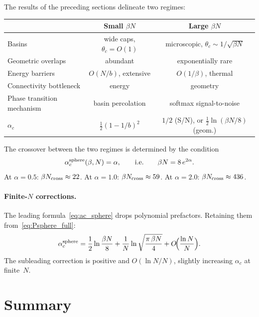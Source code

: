 \documentclass[11pt]{article}
\begin{document}
The results of the preceding sections delineate two regimes:

\begin{center}
\begin{tabular}{lcc}
\toprule
  & Small $\beta N$ & Large $\beta N$ \\
\midrule
Basins & wide caps, $\theta_c = O(1)$
       & microscopic, $\theta_c \sim 1/\sqrt{\beta N}$ \\
Geometric overlaps & abundant
                   & exponentially rare \\
Energy barriers & $O(N/b)$, extensive
               & $O(1/\beta)$, thermal \\
Connectivity bottleneck & energy
                        & geometry \\
Phase transition mechanism & basin percolation
                          & softmax signal-to-noise \\
$\alpha_c$ & $\frac{1}{2}(1-1/b)^2$
           & $1/2$ (S/N), or $\frac{1}{2}\ln(\beta N/8)$ (geom.) \\
\bottomrule
\end{tabular}
\end{center}

The crossover between the two regimes is determined by
the condition
\begin{equation}
  \alpha_c^{\rm sphere}(\beta, N) = \alpha,
  \qquad\text{i.e.}\qquad
  \beta N = 8\,e^{2\alpha}.
\end{equation}
At $\alpha = 0.5$: $\beta N_{\rm cross} \approx 22$.
At $\alpha = 1.0$: $\beta N_{\rm cross} \approx 59$.
At $\alpha = 2.0$: $\beta N_{\rm cross} \approx 436$.

\paragraph{Finite-$N$ corrections.}
The leading formula~\eqref{eq:ac_sphere} drops polynomial
prefactors.  Retaining them from~\eqref{eq:Psphere_full}:
\begin{equation}\label{eq:ac_refined}
  \alpha_c^{\rm sphere}
  = \frac{1}{2}\ln\frac{\beta N}{8}
  + \frac{1}{N}\ln\sqrt{\frac{\pi\,\beta N}{4}}
  + O\!\Bigl(\frac{\ln N}{N}\Bigr).
\end{equation}
The subleading correction is positive and $O(\ln N / N)$,
slightly increasing $\alpha_c$ at finite~$N$.


\section{Summary}
\label{sec:summary}
\end{document}
